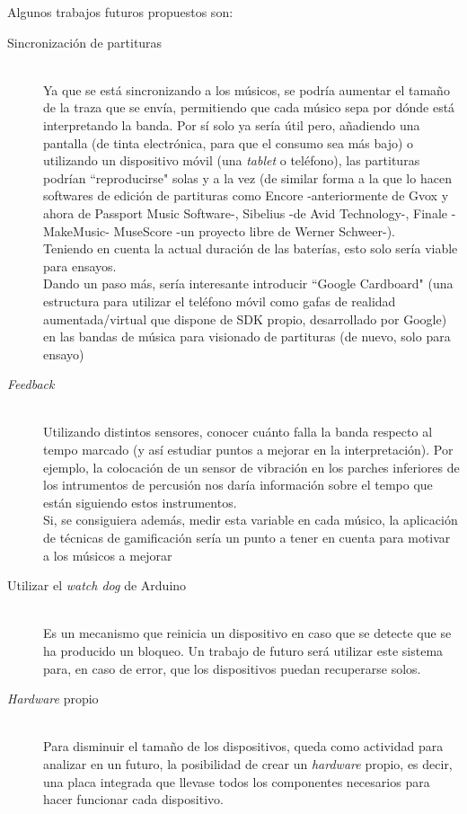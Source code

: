 Algunos trabajos futuros propuestos son:
\begin{description}
    \item[Sincronización de partituras] \hfill \\
      Ya que se está sincronizando a los músicos, se podría aumentar el tamaño de la traza
      que se envía, permitiendo que cada músico sepa por dónde está interpretando la banda.
      Por sí solo ya sería útil pero, añadiendo una pantalla (de tinta electrónica, para que el consumo
      sea más bajo) o utilizando un dispositivo móvil (una \textit{tablet} o teléfono), las partituras
      podrían ``reproducirse" solas y a la vez (de similar forma a la que lo hacen softwares de edición
      de partituras como Encore -anteriormente de Gvox y ahora de Passport Music Software-, Sibelius -de Avid Technology-,
      Finale -MakeMusic- MuseScore -un proyecto libre de Werner Schweer-).\\
      Teniendo en cuenta la actual duración de las baterías, esto solo sería viable para ensayos.\\
      Dando un paso más, sería interesante introducir ``Google Cardboard" \cite{cardboard} (una estructura
      para utilizar el teléfono móvil como gafas de realidad aumentada/virtual que dispone de SDK propio, desarrollado por Google)
      en las bandas de música para visionado de partituras (de nuevo, solo para ensayo)

    \item[\textit{Feedback}] \hfill \\
      Utilizando distintos sensores, conocer cuánto falla la banda respecto al tempo marcado (y así estudiar
      puntos a mejorar en la interpretación). Por ejemplo, la colocación de un sensor de vibración
      en los parches inferiores de los intrumentos de percusión nos daría información sobre el tempo que están
      siguiendo estos instrumentos.\\
      Si, se consiguiera además, medir esta variable en cada músico, la aplicación de técnicas de gamificación
      sería un punto a tener en cuenta para motivar a los músicos a mejorar

    \item[Utilizar el \textit{watch dog} de Arduino] \hfill \\
      Es un mecanismo que reinicia un dispositivo en caso que se detecte que se ha producido un bloqueo.
      Un trabajo de futuro será utilizar este sistema para,
      en caso de error, que los dispositivos puedan recuperarse solos.
    \item[\textit{Hardware} propio] \hfill \\
      Para disminuir el tamaño de los dispositivos, queda como actividad para analizar en un futuro, la posibilidad
      de crear un \textit{hardware} propio, es decir, una placa integrada que llevase todos los componentes necesarios
      para hacer funcionar cada dispositivo.


\end{description}
